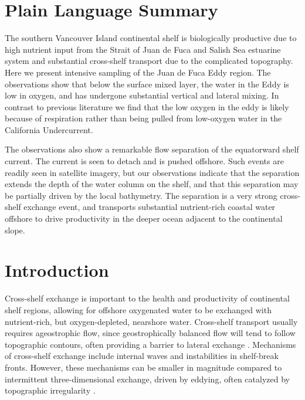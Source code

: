 \documentclass[draft]{agujournal2019}
\begin{document}
\section*{Plain Language Summary}

The southern Vancouver Island continental shelf is biologically productive due to high nutrient input from the Strait of Juan de Fuca and Salish Sea estuarine system and substantial cross-shelf transport due to the complicated topography.  Here we present intensive sampling of the Juan de Fuca Eddy region. The observations show that below the surface mixed layer, the water in the Eddy is low in oxygen, and has undergone substantial vertical and lateral mixing. In contrast to previous literature we find that the low oxygen in the eddy is likely because of respiration rather than being pulled from low-oxygen water in the California Undercurrent.

The observations also show a remarkable flow separation of the equatorward shelf current.  The current is seen to detach and is pushed offshore. Such events are readily seen in satellite imagery, but our observations indicate that the separation extends the depth of the water column on the shelf, and that this separation may be partially driven by the local bathymetry.  The separation is a very strong cross-shelf exchange event, and transports substantial nutrient-rich coastal water offshore to drive productivity in the deeper ocean adjacent to the continental slope.

%
%


\section{Introduction}

Cross-shelf exchange is important to the health and productivity of continental shelf regions, allowing for offshore oxygenated water to be exchanged with nutrient-rich, but oxygen-depleted, nearshore water.  Cross-shelf transport usually requires ageostrophic flow, since geostrophically balanced flow will tend to follow topographic contours, often providing a barrier to lateral exchange \cite{brink16}.  Mechanisms of cross-shelf exchange include internal waves and instabilities in shelf-break fronts.  However, these mechanisms can be smaller in magnitude compared to intermittent three-dimensional exchange, driven by eddying, often catalyzed by topographic irregularity \cite{barthetal00}.
\end{document}
